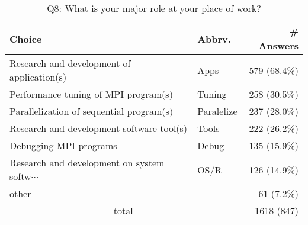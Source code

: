 \begin{table}[htb]%
\begin{center}%
\caption{Q8: What is your major role at your place of work?}%
\label{tab:Q8-ans}%
\begin{tabular}{l|l|r}%
\hline%
Choice & Abbrv. & \# Answers \\%
\hline%
{\small Research and development of application(s)} & Apps & 579 (68.4\%) \\%
Performance tuning of MPI program(s) & Tuning & 258 (30.5\%) \\%
Parallelization of sequential program(s) & Paralelize & 237 (28.0\%) \\%
{\small Research and development software tool(s)} & Tools & 222 (26.2\%) \\%
Debugging MPI programs & Debug & 135 (15.9\%) \\%
{\small Research and development on system softw$\cdots$} & OS/R & 126 (14.9\%) \\%
other & - & 61 (7.2\%) \\%
\hline%
\multicolumn{2}{c}{total} & 1618 (847)\\%
\hline%
\end{tabular}%
\end{center}%
\end{table}%

